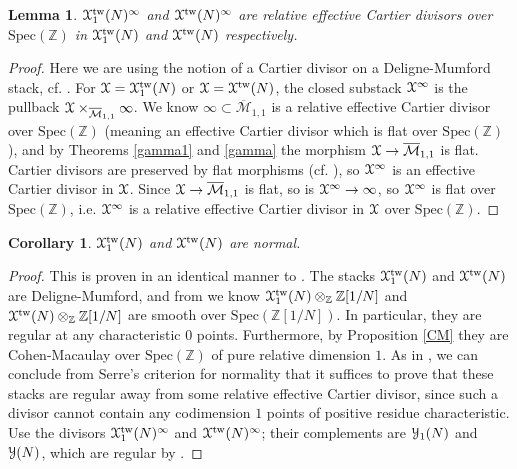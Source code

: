 \documentclass[11pt]{amsart}
\newtheorem{corollary}[subsection]{Corollary}
\newtheorem{lemma}[subsection]{Lemma}
\theoremstyle{definition}
\begin{document}
\begin{lemma}\label{cartier}
${\mathbf{\EuScript{X}}}^{\mathrm{tw}}_1(N)^\infty$ and ${\mathbf{\EuScript{X}}}^{\mathrm{tw}}(N)^\infty$ are relative effective Cartier divisors over $\mathrm{Spec}(\mathbb{Z})$ in ${\mathbf{\EuScript{X}}}^{\mathrm{tw}}_1(N)$ and ${\mathbf{\EuScript{X}}}^{\mathrm{tw}}(N)$ respectively.
\end{lemma}
\begin{proof}
Here we are using the notion of a Cartier divisor on a Deligne-Mumford stack, cf. \cite[Ch. XIII]{ACG}. For ${\mathbf{\EuScript{X}}} = {\mathbf{\EuScript{X}}}^{\mathrm{tw}}_1(N)$ or ${\mathbf{\EuScript{X}}} = {\mathbf{\EuScript{X}}}^{\mathrm{tw}}(N)$, the closed substack ${\mathbf{\EuScript{X}}}^\infty$ is the pullback ${\mathbf{\EuScript{X}}} \times_{\overline{\mathcal{M}}_{1,1}} \infty$. We know $\infty \subset \overline{\mathcal{M}}_{1,1}$ is a relative effective Cartier divisor over $\mathrm{Spec}(\mathbb{Z})$ (meaning an effective Cartier divisor which is flat over $\mathrm{Spec}(\mathbb{Z})$), and by Theorems \ref{gamma1} and \ref{gamma} the morphism ${\mathbf{\EuScript{X}}} \rightarrow \overline{\mathcal{M}}_{1,1}$ is flat. Cartier divisors are preserved by flat morphisms (cf. \cite[\S1.7]{F}), so ${\mathbf{\EuScript{X}}}^\infty$ is an effective Cartier divisor in ${\mathbf{\EuScript{X}}}$. Since ${\mathbf{\EuScript{X}}} \rightarrow \overline{\mathcal{M}}_{1,1}$ is flat, so is ${\mathbf{\EuScript{X}}}^\infty \rightarrow \infty$, so ${\mathbf{\EuScript{X}}}^\infty$ is flat over $\mathrm{Spec}(\mathbb{Z})$, i.e. ${\mathbf{\EuScript{X}}}^\infty$ is a relative effective Cartier divisor in ${\mathbf{\EuScript{X}}}$ over $\mathrm{Spec}(\mathbb{Z})$.
\end{proof}

\begin{corollary}
${\mathbf{\EuScript{X}}}_1^{\mathrm{tw}}(N)$ and ${\mathbf{\EuScript{X}}}^{\mathrm{tw}}(N)$ are normal.
\end{corollary}
\begin{proof}
This is proven in an identical manner to \cite[4.1.4]{C}. The stacks ${\mathbf{\EuScript{X}}}_1^{\mathrm{tw}}(N)$ and ${\mathbf{\EuScript{X}}}^{\mathrm{tw}}(N)$ are Deligne-Mumford, and from \cite[3.0.2]{ACV} we know ${\mathbf{\EuScript{X}}}_1^{\mathrm{tw}}(N) \otimes_\mathbb{Z} \mathbb{Z}[1/N]$ and ${\mathbf{\EuScript{X}}}^{\mathrm{tw}}(N) \otimes_\mathbb{Z} \mathbb{Z}[1/N]$ are smooth over $\mathrm{Spec}(\mathbb{Z}[1/N])$. In particular, they are regular at any characteristic $0$ points. Furthermore, by Proposition \ref{CM} they are Cohen-Macaulay over $\mathrm{Spec}(\mathbb{Z})$ of pure relative dimension $1$. As in \cite[4.1.4]{C}, we can conclude from Serre's criterion for normality that it suffices to prove that these stacks are regular away from some relative effective Cartier divisor, since such a divisor cannot contain any codimension $1$ points of positive residue characteristic. Use the divisors ${\mathbf{\EuScript{X}}}_1^{\mathrm{tw}}(N)^{\infty}$ and ${\mathbf{\EuScript{X}}}^{\mathrm{tw}}(N)^{\infty}$; their complements are ${\mathbf{\EuScript{Y}}}_1(N)$ and ${\mathbf{\EuScript{Y}}}(N)$, which are regular by \cite[5.1.1]{KM1}.
\end{proof}
\end{document}
